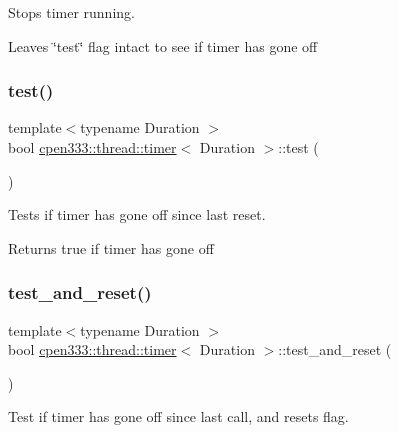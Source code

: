 Stops timer running. 

Leaves \char`\"{}test\char`\"{} flag intact to see if timer has gone off \mbox{\label{classcpen333_1_1thread_1_1timer_af81a4656b66d8bebd7497ffe826f4373}} 
\subsubsection{\texorpdfstring{test()}{test()}}
{\footnotesize\ttfamily template$<$typename Duration $>$ \\
bool \hyperlink{classcpen333_1_1thread_1_1timer}{cpen333\+::thread\+::timer}$<$ Duration $>$\+::test (\begin{DoxyParamCaption}{ }\end{DoxyParamCaption})\hspace{0.3cm}{\ttfamily [inline]}}



Tests if timer has gone off since last reset. 

\begin{DoxyReturn}{Returns}
true if timer has gone off 
\end{DoxyReturn}
\mbox{\label{classcpen333_1_1thread_1_1timer_a6fc134f093e0ff35ef1baebefd62ed8b}} 
\subsubsection{\texorpdfstring{test\+\_\+and\+\_\+reset()}{test\_and\_reset()}}
{\footnotesize\ttfamily template$<$typename Duration $>$ \\
bool \hyperlink{classcpen333_1_1thread_1_1timer}{cpen333\+::thread\+::timer}$<$ Duration $>$\+::test\+\_\+and\+\_\+reset (\begin{DoxyParamCaption}{ }\end{DoxyParamCaption})\hspace{0.3cm}{\ttfamily [inline]}}



Test if timer has gone off since last call, and resets flag. 

